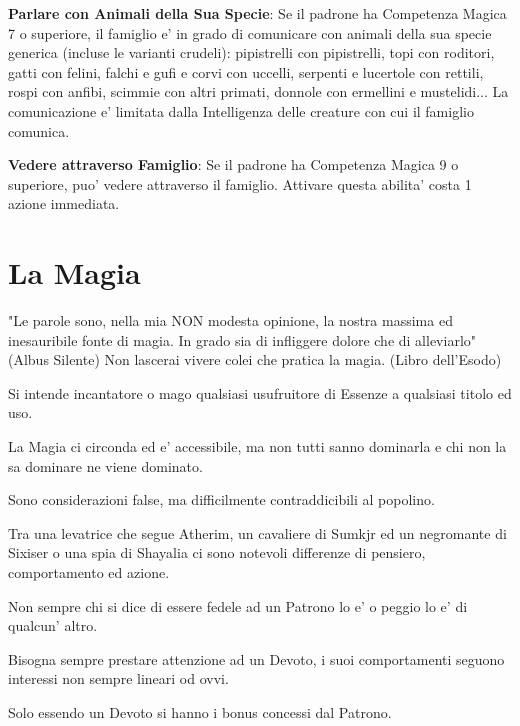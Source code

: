 \documentclass[a4paper,11pt,twoside,openany]{dndbook}
\begin{document}
\textbf{Parlare con Animali della Sua Specie}: Se il padrone ha Competenza Magica 7 o superiore, il famiglio e' in grado di comunicare con animali della sua specie generica (incluse le varianti crudeli): pipistrelli con pipistrelli, topi con roditori, gatti con felini, falchi e gufi e corvi con uccelli, serpenti e lucertole con rettili, rospi con anfibi, scimmie con altri primati, donnole con ermellini e mustelidi... La comunicazione e' limitata dalla Intelligenza delle creature con cui il famiglio comunica.

\textbf{Vedere attraverso Famiglio}: Se il padrone ha Competenza Magica 9 o superiore, puo' vedere attraverso il famiglio. Attivare questa abilita' costa 1 azione immediata.

\pagebreak

\section{La Magia}

\label{la-magia}
\begin{quotebox}
"Le parole sono, nella mia NON modesta opinione, la nostra massima ed inesauribile fonte di magia. In grado sia di infliggere dolore che di alleviarlo" (Albus Silente)\linebreak\linebreak
Non lascerai vivere colei che pratica la magia. (Libro dell'Esodo)
\end{quotebox}

Si intende incantatore o mago qualsiasi usufruitore di Essenze a qualsiasi titolo ed uso.

La Magia ci circonda ed e' accessibile, ma non tutti sanno dominarla e chi non la sa dominare ne viene dominato.

Sono considerazioni false, ma difficilmente contraddicibili al popolino.

Tra una levatrice che segue Atherim, un cavaliere di Sumkjr ed un negromante di Sixiser o una spia di Shayalia ci sono notevoli differenze di pensiero, comportamento ed azione.

Non sempre chi si dice di essere fedele ad un Patrono lo e' o peggio lo e' di qualcun' altro.

Bisogna sempre prestare attenzione ad un Devoto, i suoi comportamenti seguono interessi non sempre lineari od ovvi.

Solo essendo un Devoto si hanno i bonus concessi dal Patrono. 
\end{document}
